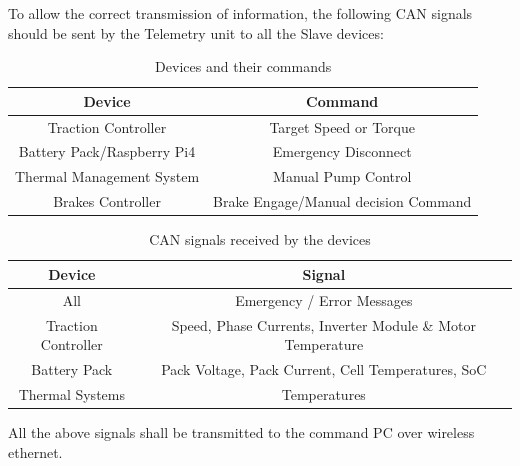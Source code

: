 To allow the correct transmission of information, the following CAN signals should be sent by the Telemetry unit to all the Slave devices:
\begin{table}[H]
    \centering
    \begin{adjustbox}{max width=0.5\textwidth,center}
    \begin{tabular}{|c|c|}
        \hline
        \textbf{Device} & \textbf{Command} \\ 
        \hline
        Traction Controller & Target Speed or Torque \\ 
        \hline
        Battery Pack/Raspberry Pi4 & Emergency Disconnect \\ 
        \hline
        Thermal Management System & Manual Pump Control \\ 
        \hline
        Brakes Controller & Brake Engage/Manual decision Command \\ 
        \hline
    \end{tabular}
    \end{adjustbox}
 \caption{Devices and their commands}
\label{tab:Command devices.}
\end{table}

\begin{table}[H]
    \centering
    \begin{adjustbox}{max width=0.75\textwidth,center}
    \begin{tabular}{|c|c|}
        \hline
        \textbf{Device} & \textbf{Signal} \\
        \hline
        All & Emergency / Error Messages \\
        \hline
        Traction Controller & Speed, Phase Currents, Inverter Module \& Motor Temperature \\
        \hline
        Battery Pack & Pack Voltage, Pack Current, Cell Temperatures, SoC \\
        \hline
        Thermal Systems & Temperatures \\
        \hline
    \end{tabular}
    \end{adjustbox}
    \caption{CAN signals received by the devices}
\label{tab:CAN signals.}
\end{table}

All the above signals shall be transmitted to the command PC over wireless ethernet.

